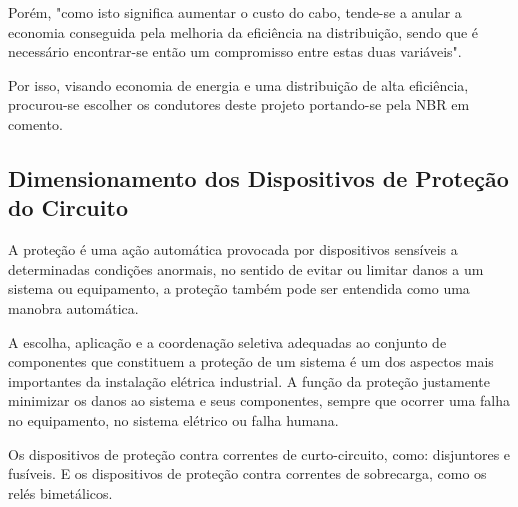 Porém, "como isto significa aumentar o custo do cabo, tende-se a anular a economia conseguida pela melhoria da eficiência na distribuição, sendo que é necessário encontrar-se então um compromisso entre estas duas variáveis".

Por isso, visando economia de energia e uma distribuição de alta eficiência, procurou-se escolher os condutores deste projeto portando-se pela NBR em comento.

\subsection{Dimensionamento dos Dispositivos de Proteção do Circuito}

A proteção é uma ação automática provocada por dispositivos sensíveis a determinadas condições anormais, no sentido de evitar ou limitar danos a um sistema ou equipamento, a proteção também pode ser entendida como uma manobra automática.

A escolha, aplicação e a coordenação seletiva adequadas ao conjunto de componentes que constituem a proteção de um sistema é um dos aspectos mais importantes da instalação elétrica industrial. A função da proteção justamente minimizar os danos ao sistema e seus componentes, sempre que ocorrer uma falha no equipamento, no sistema elétrico ou falha humana.

Os dispositivos de proteção contra correntes de curto-circuito, como: disjuntores e fusíveis. E os dispositivos de proteção contra correntes de sobrecarga, como os relés bimetálicos.
